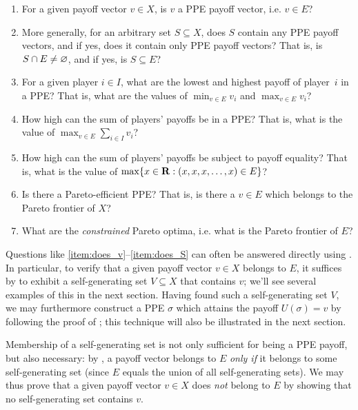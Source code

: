 \begin{enumerate}

	\item \label{item:does_v} For a given payoff vector $v \in X$, is $v$ a PPE payoff vector, i.e. $v \in E$?

	\item \label{item:does_S} More generally, for an arbitrary set $S \subseteq X$, does $S$ contain any PPE payoff vectors, and if yes, does it contain only PPE payoff vectors? That is, is $S \cap E \neq \varnothing$, and if yes, is $S \subseteq E$?

	\item \label{item:does_max1} For a given player $i \in I$, what are the lowest and highest payoff of player~$i$ in a PPE? That is, what are the values of $\min_{v \in E} v_i$ and $\max_{v \in E} v_i$?

	\item \label{item:does_max2} How high can the sum of players' payoffs be in a PPE? That is, what is the value of $\max_{v \in E} \sum_{i \in I} v_i$?

	\item \label{item:does_max3} How high can the sum of players' payoffs be subject to payoff equality? That is, what is the value of $\max \{ x \in \mathbf{R} : (x,x,x,\dots,x) \in E \}$?

	\item \label{item:does_max4} Is there a Pareto-efficient PPE? That is, is there a $v \in E$ which belongs to the Pareto frontier of $X$?

	\item \label{item:does_max5} What are the \emph{constrained} Pareto optima, i.e. what is the Pareto frontier of $E$?

\end{enumerate}

Questions like \ref{item:does_v}--\ref{item:does_S} can often be answered directly using . In particular, to verify that a given payoff vector $v \in X$ belongs to $E$, it suffices by  to exhibit a self-generating set $V \subseteq X$ that contains $v$; we'll see several examples of this in the next section. Having found such a self-generating set $V$, we may furthermore construct a PPE $\sigma$ which attains the payoff $U(\sigma)=v$ by following the proof of ; this technique will also be illustrated in the next section.

Membership of a self-generating set is not only sufficient for being a PPE payoff, but also necessary: by , a payoff vector belongs to $E$ \emph{only if} it belongs to some self-generating set (since $E$ equals the union of all self-generating sets). We may thus prove that a given payoff vector $v \in X$ does \emph{not} belong to $E$ by showing that no self-generating set contains $v$.


